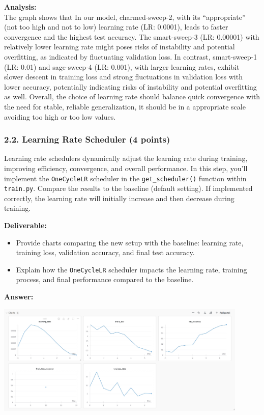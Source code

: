 \documentclass[11pt, oneside]{article}   	%
\begin{document}
\textbf{Analysis: }
\\
The graph shows that In our model, charmed-sweep-2, with its ``appropriate'' (not too high and not to low) learning rate (LR: 0.0001), leads to faster convergence and the highest test accuracy. The smart-sweep-3 (LR: 0.00001) with relatively lower learning rate might poses risks of instability and potential overfitting, as indicated by fluctuating validation loss. In contrast, smart-sweep-1 (LR: 0.01) and sage-sweep-4 (LR: 0.001), with larger learning rates, exhibit slower descent in training loss and strong fluctuations in validation loss with lower accuracy, potentially indicating risks of instability and potential overfitting as well. Overall, the choice of learning rate should balance quick convergence with the need for stable, reliable generalization, it should be in a appropriate scale avoiding too high or too low values. 

\subsubsection*{2.2. Learning Rate Scheduler (4 points)}

Learning rate schedulers dynamically adjust the learning rate during training, improving efficiency, convergence, and overall performance. In this step, you'll implement the \texttt{OneCycleLR} scheduler in the \texttt{get\_scheduler()} function within \texttt{train.py}. Compare the results to the baseline (default setting). If implemented correctly, the learning rate will initially increase and then decrease during training.

\noindent\textbf{Deliverable:}
\begin{itemize}
    \item Provide charts comparing the new setup with the baseline: learning rate, training loss, validation accuracy, and final test accuracy.
    \item Explain how the \texttt{OneCycleLR} scheduler impacts the learning rate, training process, and final performance compared to the baseline.
\end{itemize}

\textbf{Answer:} \\
\begin{center}
    \includegraphics[width=0.9\textwidth]{report_pic/SchedulerChart.png}
\end{center}
\end{document}
